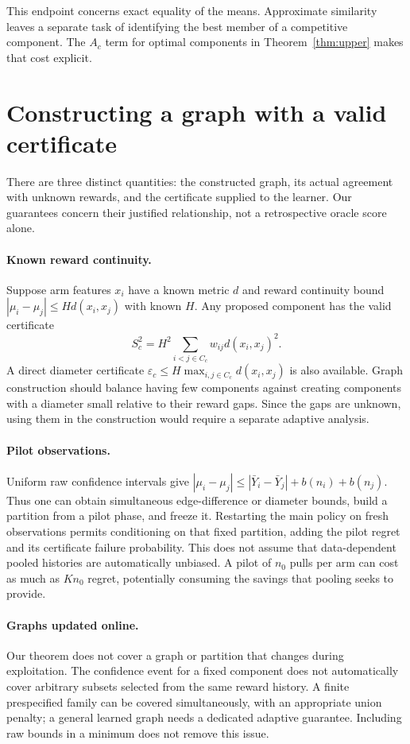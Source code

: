 \documentclass[11pt]{article}
\begin{document}
This endpoint concerns exact equality of the means. Approximate similarity leaves a separate task of identifying the best member of a competitive component. The $A_c$ term for optimal components in Theorem~\ref{thm:upper} makes that cost explicit.



\section{Constructing a graph with a valid certificate}
There are three distinct quantities: the constructed graph, its actual agreement with unknown rewards, and the certificate supplied to the learner. Our guarantees concern their justified relationship, not a retrospective oracle score alone.

\paragraph{Known reward continuity.}
Suppose arm features $x_i$ have a known metric $d$ and reward continuity bound
$|\mu_i-\mu_j|\le H d(x_i,x_j)$ with known $H$. Any proposed component has the valid certificate
\begin{equation}
 S_c^2=H^2\sum_{i<j\in C_c}w_{ij}d(x_i,x_j)^2.
\end{equation}
A direct diameter certificate $\varepsilon_c\le H\max_{i,j\in C_c}d(x_i,x_j)$ is also available. Graph construction should balance having few components against creating components with a diameter small relative to their reward gaps. Since the gaps are unknown, using them in the construction would require a separate adaptive analysis.

\paragraph{Pilot observations.}
Uniform raw confidence intervals give
$|\mu_i-\mu_j|\le|\bar Y_i-\bar Y_j|+b(n_i)+b(n_j)$.
Thus one can obtain simultaneous edge-difference or diameter bounds, build a partition from a pilot phase, and freeze it. Restarting the main policy on fresh observations permits conditioning on that fixed partition, adding the pilot regret and its certificate failure probability. This does not assume that data-dependent pooled histories are automatically unbiased. A pilot of $n_0$ pulls per arm can cost as much as $Kn_0$ regret, potentially consuming the savings that pooling seeks to provide.

\paragraph{Graphs updated online.}
Our theorem does not cover a graph or partition that changes during exploitation. The confidence event for a fixed component does not automatically cover arbitrary subsets selected from the same reward history. A finite prespecified family can be covered simultaneously, with an appropriate union penalty; a general learned graph needs a dedicated adaptive guarantee. Including raw bounds in a minimum does not remove this issue.
\end{document}
